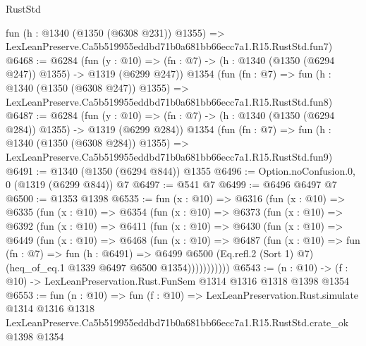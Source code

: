 \begin{lexlean}{RustStd}
\begin{coremodule}
    fun (h : @1340 (@1350 (@6308 @231)) @1355) =>
    LexLeanPreserve.Ca5b519955eddbd71b0a681bb66ecc7a1.R15.RustStd.fun7)
@6468 := @6284
    (fun (y : @10) => (fn : @7) -> (h : @1340 (@1350 (@6294 @247)) @1355) -> @1319 (@6299 @247))
    @1354
    (fun (fn : @7) =>
    fun (h : @1340 (@1350 (@6308 @247)) @1355) =>
    LexLeanPreserve.Ca5b519955eddbd71b0a681bb66ecc7a1.R15.RustStd.fun8)
@6487 := @6284
    (fun (y : @10) => (fn : @7) -> (h : @1340 (@1350 (@6294 @284)) @1355) -> @1319 (@6299 @284))
    @1354
    (fun (fn : @7) =>
    fun (h : @1340 (@1350 (@6308 @284)) @1355) =>
    LexLeanPreserve.Ca5b519955eddbd71b0a681bb66ecc7a1.R15.RustStd.fun9)
@6491 := @1340 (@1350 (@6294 @844)) @1355
@6496 := Option.noConfusion.{0, 0} (@1319 (@6299 @844)) @7
@6497 := @541 @7
@6499 := @6496 @6497 @7
@6500 := @1353 @1398
@6535 := fun (x : @10) =>
  @6316
    (fun (x : @10) =>
    @6335
      (fun (x : @10) =>
      @6354
        (fun (x : @10) =>
        @6373
          (fun (x : @10) =>
          @6392
            (fun (x : @10) =>
            @6411
              (fun (x : @10) =>
              @6430
                (fun (x : @10) =>
                @6449
                  (fun (x : @10) =>
                  @6468
                    (fun (x : @10) =>
                    @6487
                      (fun (x : @10) =>
                      fun (fn : @7) =>
                      fun (h : @6491) =>
                      @6499
                        @6500
                        (Eq.refl.{2} (Sort 1) @7)
                        (heq_of_eq.{1} @1339 @6497 @6500 @1354)))))))))))
@6543 := (n : @10) -> (f : @10) -> LexLeanPreservation.Rust.FunSem @1314 @1316 @1318 @1398 @1354
@6553 := fun (n : @10) =>
  fun (f : @10) =>
  LexLeanPreservation.Rust.simulate
    @1314
    @1316
    @1318
    LexLeanPreserve.Ca5b519955eddbd71b0a681bb66ecc7a1.R15.RustStd.crate_ok
    @1398
    @1354
\end{coremodule}
\end{lexlean}
